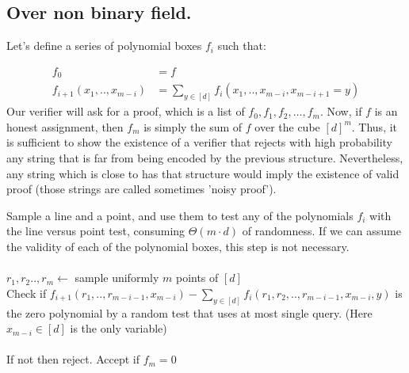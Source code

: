 \documentclass{article}
\begin{document}
\subsection{Over non binary field. } Let's define a series of polynomial boxes $f_{i}$ such that: 

\begin{equation*}
  \begin{split}
    f_{0} & = f \\ 
  f_{i+1} \left( x_{1}, .. , x_{m-i} \right) & = \sum_{y \in [d] } f_{i}\left(x_{1}, .. , x_{m-i}, x_{m-i+1} = y \right)
  \end{split}
\end{equation*}
%
Our verifier will ask for a proof, which is a list of $f_{0}, f_{1}, f_{2}, \dots, f_{m}$. Now, if $f$ is an honest assignment, then $f_{m}$ is simply the sum of $f$ over the cube $[d]^{m}$. Thus, it is sufficient to show the existence of a verifier that rejects with high probability any string that is far from being encoded by the previous structure. Nevertheless, any string which is close to has that structure would imply the existence of valid proof (those strings are called sometimes 'noisy proof').    

\begin{algorithm}[H]
Sample a line and a point, and use them to test any of the polynomials $f_i$ with the line versus point test, consuming $\Theta\left( m\cdot d \right)$ of randomness. If we can assume the validity of each of the polynomial boxes, this step is not necessary. \\
\ \\
    $r_{1}, r_{2} .., r_{m} \leftarrow$ sample uniformly  $m$ points of $[d]$ \\
     {
      Check if $f_{i+1}\left( r_{1} , .., r_{m-i-1}, x_{m-i} \right) - \sum_{y \in [d]}{f_{i} \left( r_{1}, r_{2}, .., r_{m-i-1},x_{m-i}, y \right)} $ is the zero polynomial by a random test that uses at most single query. (Here $x_{m-i} \in [d]$ is the only variable)  \\
      \ \\
      If not then reject.  
    }
    Accept if $f_{m} = 0 $  
\end{algorithm}
\end{document}
